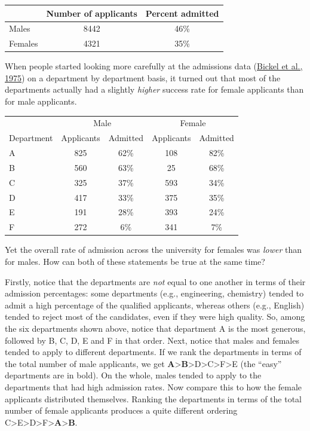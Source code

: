 \documentclass[
  11pt,
  a4paper,
  twoside,symmetric,openright]{book}
\theoremstyle{break}
\theoremstyle{break}
\begin{document}
\begin{table}[H]
\centering
\begin{tabular}{lcc}
\toprule
  & Number of applicants & Percent admitted\\
\midrule
Males & 8442 & 46\%\\
Females & 4321 & 35\%\\
\bottomrule
\end{tabular}
\end{table}

When people started looking more carefully at the admissions data (\protect\hyperlink{ref-Bickel1975}{Bickel et al., 1975}) on a department by department basis, it turned out that most of the departments actually had a slightly \emph{higher} success rate for female applicants than for male applicants.

\begin{table}[H]
\centering
\begin{tabular}{lcccc}
\toprule
\multicolumn{1}{c}{ } & \multicolumn{2}{c}{Male} & \multicolumn{2}{c}{Female} \\
\cmidrule(l{3pt}r{3pt}){2-3} \cmidrule(l{3pt}r{3pt}){4-5}
Department & Applicants & Admitted & Applicants & Admitted\\
\midrule
A & 825 & 62\% & 108 & 82\%\\
B & 560 & 63\% & 25 & 68\%\\
C & 325 & 37\% & 593 & 34\%\\
D & 417 & 33\% & 375 & 35\%\\
E & 191 & 28\% & 393 & 24\%\\
F & 272 & 6\% & 341 & 7\%\\
\bottomrule
\end{tabular}
\end{table}

Yet the overall rate of admission across the university for females was \emph{lower} than for males. How can both of these statements be true at the same time?

Firstly, notice that the departments are \emph{not} equal to one another in terms of their admission percentages: some departments (e.g., engineering, chemistry) tended to admit a high percentage of the qualified applicants, whereas others (e.g., English) tended to reject most of the candidates, even if they were high quality. So, among the six departments shown above, notice that department A is the most generous, followed by B, C, D, E and F in that order. Next, notice that males and females tended to apply to different departments. If we rank the departments in terms of the total number of male applicants, we get \textbf{A}\textgreater{}\textbf{B}\textgreater D\textgreater C\textgreater F\textgreater E (the ``easy'' departments are in bold). On the whole, males tended to apply to the departments that had high admission rates. Now compare this to how the female applicants distributed themselves. Ranking the departments in terms of the total number of female applicants produces a quite different ordering C\textgreater E\textgreater D\textgreater F\textgreater{}\textbf{A}\textgreater{}\textbf{B}.
\end{document}
